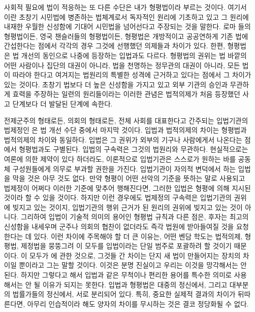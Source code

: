 사회적 필요에 법이 적응하는 또 다른 수단은 내가 형평법이라 부르는 것이다.
여기서 이란 초창기 시민법에 병존하는 법체계로서
독자적인 원리에 기초하고 있고 그 원리에 내재한 우월한 신성함에 기대어
시민법을 넘어선다고 주장되는 것을 말한다.
로마 들의 형평법이든,
영국 챈슬러들의 형평법이든,
형평법은
개방적이고 공공연하게 기존 법에 간섭한다는 점에서
각각의 경우 그것에 선행했던 의제들과 차이가 있다.
한편, 형평법은 법 개선의 동인으로 나중에 등장하는 입법과도 다르다.
형평법의 권위는
법 바깥의 어떤 사람이나 집단의 대권이 아니라,
법을 천명하는 정무관의 대권이 아니라,
모든 법이 따라야 한다고 여겨지는 법원리의 특별한 성격에
근거하고 있다는 점에서 그 차이가 있는 것이다.
초창기 법보다 더 높은 신성함을 가지고 있고
외부 기관의 승인과 무관하게 효력을 주장하는
일련의 원리들이라는 이러한 관념은
법적의제가 처음 등장했던 사고 단계보다 더 발달된 단계에 속한다.

전제군주의 형태로든, 의회의 형태로든,
전체 사회를 대표한다고 간주되는 입법기관의 법제정인 은
법 개선 수단 중에서 마지막 것이다.
입법과 법적의제의 차이는 형평법과 법적의제의 차이와 동일하다.
입법은
그 권위가 외부의 기구나 사람에게서 나온다는 점에서
형평법과도 구별된다.
입법의 구속력은 그것의 법원리와 무관하다.
현실적으로는 여론에 의한 제약이 있다 하더라도,
이론적으로 입법기관은 스스로가 원하는 바를 공동체 구성원들에게
의무로 부과할 권한을 가진다.
입법기관이 자의적 변덕에서 하는 입법을 막을 것은 아무 것도 없다.
만약 형평이 어떤 선악의 기준을 뜻하는 말로 사용되고
법제정이 어쩌다 이러한 기준에 맞추어 행해진다면,
그러한 입법은 형평에 의해 지시된 것이라 할 수 있을 것이다.
하지만 이런 경우에도 법제정의 구속력은 입법기관의 권위에 빚지고 있는 것이지,
입법기관의 행위 근거가 된 원리의 권위에 빚지고 있는 것이 아니다.
그리하여 입법이 기술적 의미의 용어인 형평법 규칙과 다른 점은,
후자는 최고의 신성함을 내세우며 군주나 의회의 협찬이 없더라도
즉각 법원에 받아들여질 것을 요청한다는 데 있다.
이런 차이에 주목해야 할 더 큰 이유는,
어떤 벤담 학도는 법적의제, 형평법, 제정법을 뭉뚱그려
이 모두를 입법이라는 단일 범주로 포괄하려 할 것이기 때문이다.
이 모두가 에 관한 것으로,
그것들 간 차이는 단지 새 법이 만들어지는 장치의 차이일 뿐이라고 그는
말할 것이다.
이것은 분명 진실이고 우리는 이것을 망각해서는 안 된다.
하지만 그렇다고 해서 입법과 같은 무척이나 편리한 용어를
특수한 의미로 사용해서는 안 될 이유가 되지는 못한다.
입법과 형평법은 대중의 정신에서, 그리고 대부분의 법률가들의 정신에서,
서로 분리되어 있다.
특히, 중요한 실제적 결과의 차이가 뒤따른다면,
아무리 인습적이라 해도 양자의 차이를 무시하는 것은 결코 정당화될 수 없다.

